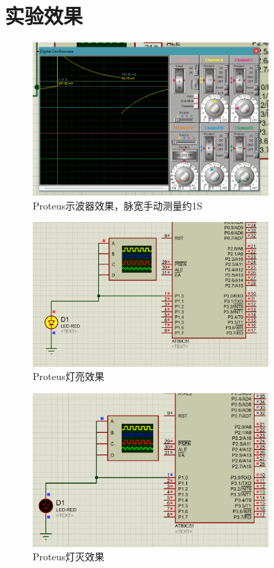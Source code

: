 \documentclass[12pt,hyperref,a4paper,UTF8]{ctexart}
\begin{document}
\section{实验效果}

\begin{figure}[H] %
    \centering
    \includegraphics[width=0.8\textwidth]{figures/201.png} %
    \caption{Proteus示波器效果，脉宽手动测量约1S} %
    \label{fig:example} %
\end{figure}

\begin{figure}[H] %
    \centering
    \includegraphics[width=0.8\textwidth]{figures/202.png} %
    \caption{Proteus灯亮效果} %
    \label{fig:example} %
\end{figure}

\begin{figure}[H] %
    \centering
    \includegraphics[width=0.8\textwidth]{figures/203.png} %
    \caption{Proteus灯灭效果} %
    \label{fig:example} %
\end{figure}
\end{document}
